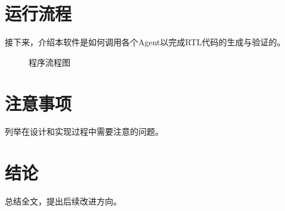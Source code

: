 \documentclass[UTF8]{ctexart}
\begin{document}
\section{运行流程}
接下来，介绍本软件是如何调用各个Agent以完成RTL代码的生成与验证的。

\begin{figure}[htbp]
    \centering
    
    \caption{程序流程图}
    \label{fig:flowchart}
\end{figure}

\section{注意事项}
列举在设计和实现过程中需要注意的问题。

\section{结论}
总结全文，提出后续改进方向。
\end{document}
